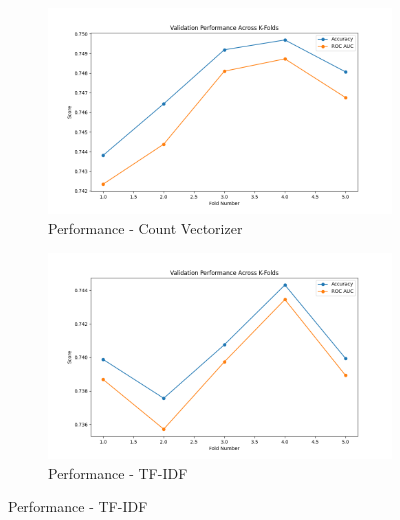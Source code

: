 \begin{figure}[H]
    \centering
    \begin{subfigure}[b]{0.48\textwidth}
        \includegraphics[width=\textwidth]{img/report_info/img/1.1.LogisticRegression/best_logistic_regression_count.png}
        \caption{Performance - Count Vectorizer}
        \label{fig:lr-count}
    \end{subfigure}
    \begin{subfigure}[b]{0.48\textwidth}
        \includegraphics[width=\textwidth]{img/report_info/img/1.1.LogisticRegression/best_logistic_regression_tfidf.png}
        \caption{Performance - TF-IDF}
        \label{fig:lr-tfidf}
    \end{subfigure}
    

\end{figure}
